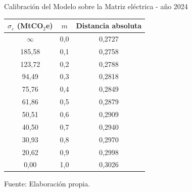 \documentclass[xcolor=dvipsnames]{beamer}
\begin{document}
\begin{frame}{Calibración del Modelo sobre la Matriz eléctrica - año 2024}
    \begin{table}[H]
\centering
\small
\label{tab:top10_distancia_mix}
\renewcommand{\arraystretch}{1.1}
\setlength{\tabcolsep}{6pt}
\begin{tabular}{c c c}
\toprule
\textbf{$\sigma_{\varepsilon}$ (MtCO$_2$e)} & \textbf{$m$} & \textbf{Distancia absoluta} \\
\midrule
$\infty$ & 0,0 & 0,2727 \\
185,58 & 0,1 & 0,2758 \\
123,72 & 0,2 & 0,2788 \\
94,49  & 0,3 & 0,2818 \\
75,76  & 0,4 & 0,2849 \\
61,86  & 0,5 & 0,2879 \\
50,51  & 0,6 & 0,2909 \\
40,50  & 0,7 & 0,2940 \\
30,93  & 0,8 & 0,2970 \\
20,62  & 0,9 & 0,2998 \\
0,00   & 1,0 & 0,3026 \\
\bottomrule
\end{tabular}

\vspace{0.15cm}
\footnotesize{Fuente: Elaboración propia.}
\end{table}
\end{frame}











\end{document}

